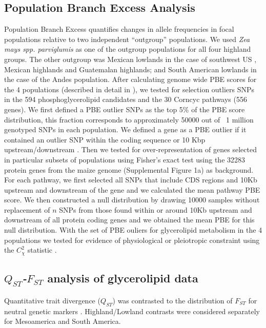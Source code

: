 \documentclass[9pt,twocolumn,twoside]{BioRxiv}
\begin{document}
\subsection{Population Branch Excess Analysis}
Population Branch Excess quantifies changes in allele frequencies in focal populations relative to two independent “outgroup” populations.
We used \textit{Zea mays spp. parviglumis} as one of the outgroup populations for all four highland groups.  
The other outgroup was  Mexican lowlands  in the case of southwest US , Mexican highlands and Guatemalan highlands; and South American lowlands in the case of the Andes population. 
After calculating genome wide PBE scores for the 4 populations (described in detail in \cite{Wang2020-mp}), we tested for selection outliers SNPs in the 594 phosphoglycerolipid candidates and the 30 Corncyc pathways (556 genes).
We first defined a PBE outlier SNPs as the top 5\% of the PBE score distribution, this fraction corresponds to approximately 50000 out of ~1 million genotyped SNPs in each population. 
We defined a gene as a PBE outlier if it contained an outlier SNP within the coding sequence or 10 Kbp upstream/downstream  \cite{Wang2020-mp}. 
Then we tested for over-representation of genes selected in particular subsets of populations using Fisher's exact test using the 32283 protein genes from the maize genome (Supplemental Figure 1a) \cite{wang2015a} as background. 
For each pathway, we first selected all SNPs that include CDS regions and 10Kb upstream and downstream of the gene and we calculated the mean pathway PBE score. 
We then constructed a null distribution by drawing 10000 samples without replacement of $n$ SNPs from those found within or around 10Kb upstream and downstream of all protein coding genes and we obtained the mean PBE for this null distribution. 
With the set of PBE ouliers for glycerolipid metabolism in the 4 populations we tested for evidence of physiological or pleiotropic constraint using the $C_\chi^2$ statistic \cite{yeaman2018}. 

\subsection{\textit{$Q_{ST}$-$F_{ST}$} analysis of glycerolipid data}
Quantitative trait divergence ($Q_{ST}$) was contrasted to the distribution of $F_{ST}$ for neutral genetic markers \cite{whitlock2008evolutionary}.
Highland/Lowland contrasts were considered separately for Mesoamerica and South America.
\end{document}
